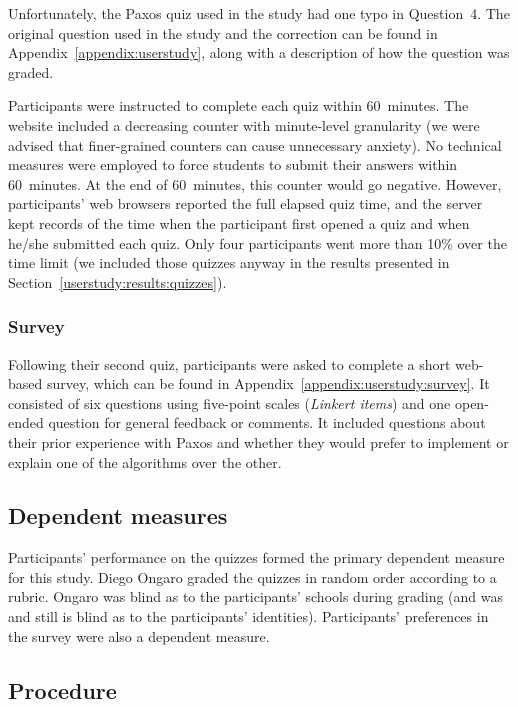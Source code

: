 Unfortunately, the Paxos quiz used in the study had one typo in
Question~4. The original question used in the study and the correction
can be found in Appendix~\ref{appendix:userstudy},
along with a description of how the question was graded.

Participants were instructed to complete each quiz within
\SI{60}{minutes}.
The website included a decreasing counter with minute-level granularity
(we were advised that finer-grained counters can cause unnecessary
anxiety). No technical measures were employed to force students to
submit their answers within \SI{60}{minutes}. At the end of
\SI{60}{minutes}, this
counter would go negative. However, participants' web browsers reported
the full elapsed quiz time, and the server kept records of the time when
the participant first opened a quiz and when he/she submitted each quiz.
Only four participants
went more than 10\% over the time limit (we included those quizzes
anyway in the results presented in
Section~\ref{userstudy:results:quizzes}).


\subsubsection{Survey}

Following their second quiz, participants were asked to complete a short
web-based survey, which can be found in
Appendix~\ref{appendix:userstudy:survey}.
It consisted of six questions using five-point scales (\emph{Linkert
items}) and one open-ended question for general feedback or comments. It
included questions about their prior experience with Paxos and whether
they would prefer to implement or explain one of the algorithms over the
other.

\subsection{Dependent measures}

Participants' performance on the quizzes formed the primary dependent
measure for this study. Diego Ongaro graded the quizzes in random order
according to a rubric. Ongaro was blind as to the participants'
schools during grading (and was and still is blind as to the
participants' identities). Participants' preferences in the survey were
also a dependent measure.

\subsection{Procedure}

